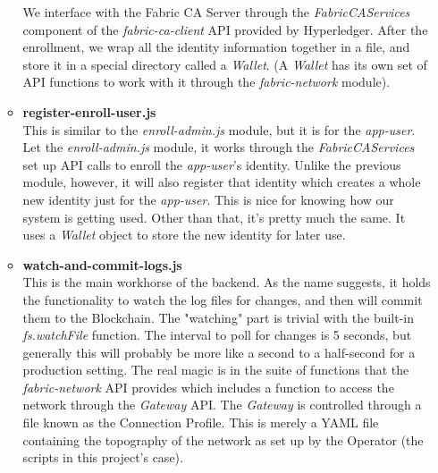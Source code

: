 \begin{itemize}
\begin{itemize}
							\hspace{10mm}We interface with the Fabric CA Server through the \textit{FabricCAServices} component of the \textit{fabric-ca-client} API provided by Hyperledger. After the enrollment, we wrap all the identity information together in a file, and store it in a special directory called a \textit{Wallet}. (A \textit{Wallet} has its own set of API functions to work with it through the \textit{fabric-network} module).
							
						\item \textbf{register-enroll-user.js}\\
							
							\hspace{10mm}This is similar to the \textit{enroll-admin.js} module, but it is for the \textit{app-user}. Let the \textit{enroll-admin.js} module, it works through the \textit{FabricCAServices} set up API calls to enroll the \textit{app-user}'s identity. Unlike the previous module, however, it will also register that identity which creates a whole new identity just for the \textit{app-user}. This is nice for knowing how our system is getting used. Other than that, it's pretty much the same. It uses a \textit{Wallet} object to store the new identity for later use.
							
						\item \textbf{watch-and-commit-logs.js}\\
						
							\hspace{10mm}This is the main workhorse of the backend. As the name suggests, it holds the functionality to watch the log files for changes, and then will commit them to the Blockchain. The "watching" part is trivial with the built-in \textit{fs.watchFile} function. The interval to poll for changes is 5 seconds, but generally this will probably be more like a second to a half-second for a production setting. The real magic is in the suite of functions that the \textit{fabric-network} API provides which includes a function to access the network through the \textit{Gateway} API. The \textit{Gateway} is controlled through a file known as the Connection Profile. This is merely a YAML file containing the topography of the network as set up by the Operator (the scripts in this project's case).\\
							

\end{itemize}
\end{itemize}
